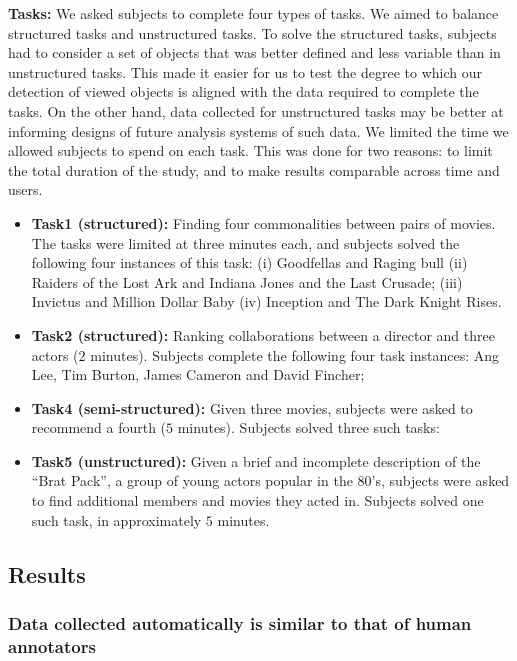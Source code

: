\textbf{Tasks:} We asked subjects to complete four types of tasks. We aimed to balance structured tasks and unstructured tasks. To solve the structured tasks, subjects had to consider a set of objects that was better defined and less variable than in unstructured tasks. This made it easier for us to test the degree to which our detection of viewed objects is aligned with the data required to complete the tasks. On the other hand, data collected for unstructured tasks may be better at informing designs of future analysis systems of such data. We limited the time we allowed subjects to spend on each task. This was done for two reasons: to limit the total duration of the study, and to make results comparable across time and users.

\begin{itemize}
	\item \textbf{Task1 (structured):} Finding four commonalities between pairs of movies. The tasks were limited at three minutes each, and subjects solved the following four instances of this task: (i) Goodfellas and Raging bull (ii) Raiders of the Lost Ark and Indiana Jones and the Last Crusade; (iii) Invictus and Million Dollar Baby (iv) Inception and The Dark Knight Rises.  
	\item \textbf{Task2 (structured):} Ranking collaborations between a director and three actors ($2$ minutes).  Subjects complete the following four task instances: Ang Lee, Tim Burton, James Cameron and David Fincher; 
	\item \textbf{Task4 (semi-structured):} Given three movies, subjects were asked to recommend a fourth ($5$ minutes). Subjects solved three such tasks: 
	\item \textbf{Task5 (unstructured):} Given a brief and incomplete description of the ``Brat Pack'', a group of young actors popular in the 80's, subjects were asked to find additional members and movies they acted in. Subjects solved one such task, in approximately $5$ minutes. 
\end{itemize}

\subsection{Results}
\subsubsection{Data collected automatically is similar to that of human annotators}
\label{sec:EvalResults}

